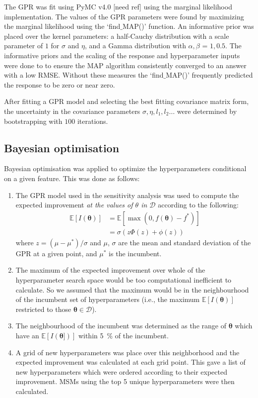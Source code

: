 \documentclass[journal=jacsat,manuscript=article]{achemso}
\begin{document}
The GPR was fit using PyMC v4.0 [need ref] using the marginal likelihood implementation.  The values of the GPR parameters were found by maximizing the marginal likelihood using the `find$\_$MAP()' function. An informative prior was placed over the kernel parameters: a half-Cauchy distribution with a scale parameter of $1$ for $\sigma$ and $\eta$, and a Gamma distribution with $\alpha, \beta$ = $1, 0.5$. The informative priors and the scaling of the response and hyperparameter inputs were done to to ensure the MAP algorithm consistently converged to an answer with a low RMSE. Without these measures the `find$\_$MAP()' frequently predicted the response to be zero or near zero. 

After fitting a GPR model and selecting the best fitting covariance matrix form, the uncertainty in the covariance parameters $\sigma, \eta, l_{1}, l_{2}\ldots$ were determined by bootstrapping with $100$ iterations. 

 
\subsection{Bayesian optimisation}
 
Bayesian optimisation was applied to optimize the hyperparameters conditional on a given feature. This was done as follows: 

\begin{enumerate}
    \item The GPR model used in the sensitivity analysis was used to compute the expected improvement \emph{at the values of $\theta$ in $\mathcal{D}$} according to the following: 
    \begin{align}
     \mathbb{E}[I(\bm{\theta})] &= \mathbb{E}[\max{(0, f(\bm{\theta})-f^{*})}] \label{eqn:ei_def} \\ 
     & = \sigma \left ( z \Phi(z)  + \phi(z) \right) \label{eqn:ei_for_gp}
    \end{align}
    where $z = (\mu-\mu^{*})/\sigma$ and $\mu$, $\sigma$ are the mean and standard deviation of the GPR at a given point, and $\mu^{*}$ is the incumbent. 
    \item The maximum of the expected improvement over whole of the hyperparameter search space would be too computational inefficient to calculate. So we assumed that the maximum would be in the neighbourhood of the incumbent set of hyperparameters (i.e., the maximum $\mathbb{E}[I(\bm{\theta})]$ restricted to those $\bm{\theta}\in \mathcal{D}$). 
    \item The neighbourhood of the incumbent was determined as the range of $\bm{\theta}$ which have an $\mathbb{E}[I(\bm{\theta}])]$ within \SI{5}{\percent} of the incumbent. 
    \item A grid of new hyperparameters was place over this neighborhood and the expected improvement was calculated at each grid point.  This gave a list of new hyperparameters which were ordered according to their expected improvement.  MSMs using the top 5 unique hyperparameters were then calculated. 
\end{enumerate}
\end{document}
